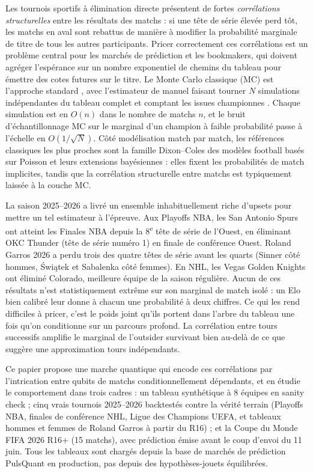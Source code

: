 \documentclass[11pt]{article}
\begin{document}
Les tournois sportifs à élimination directe présentent de fortes
\emph{corrélations structurelles} entre les résultats des matchs : si
une tête de série élevée perd tôt, les matchs en aval sont rebattus de
manière à modifier la probabilité marginale de titre de tous les
autres participants. Pricer correctement ces corrélations est un
problème central pour les marchés de prédiction et les bookmakers, qui
doivent agréger l'espérance sur un nombre exponentiel de chemins du
tableau pour émettre des cotes futures sur le titre. Le Monte Carlo
classique (MC) est l'approche standard
\cite{glasserman2004monte}, avec l'estimateur de manuel faisant tourner
$N$ simulations indépendantes du tableau complet et comptant les
issues championnes \cite{simulate_bracket_pulsquant}. Chaque simulation
est en $O(n)$ dans le nombre de matchs $n$, et le bruit
d'échantillonnage MC sur le marginal d'un champion à faible
probabilité passe à l'échelle en $O(1/\sqrt{N})$. Côté modélisation
match par match, les références classiques les plus proches sont la
famille Dixon--Coles des modèles football basés sur Poisson
\cite{dixon1997modelling} et leurs extensions bayésiennes
\cite{constantinou2017bayesian} : elles fixent les probabilités de
match implicites, tandis que la corrélation structurelle entre matchs
est typiquement laissée à la couche MC.

La saison 2025--2026 a livré un ensemble inhabituellement riche
d'upsets pour mettre un tel estimateur à l'épreuve. Aux Playoffs NBA,
les San Antonio Spurs ont atteint les Finales NBA depuis la
8\textsuperscript{e} tête de série de l'Ouest, en éliminant OKC Thunder
(tête de série numéro 1) en finale de conférence Ouest. Roland Garros
2026 a perdu trois des quatre têtes de série avant les quarts (Sinner
côté hommes, Świątek et Sabalenka côté femmes). En NHL, les Vegas
Golden Knights ont éliminé Colorado, meilleure équipe de la saison
régulière. Aucun de ces résultats n'est statistiquement extrême sur
son marginal de match isolé : un Elo bien calibré leur donne à chacun
une probabilité à deux chiffres. Ce qui les rend difficiles à pricer,
c'est le poids joint qu'ils portent dans l'arbre du tableau une fois
qu'on conditionne sur un parcours profond. La corrélation entre tours
successifs amplifie le marginal de l'outsider survivant bien au-delà
de ce que suggère une approximation tours indépendants.

Ce papier propose une marche quantique qui encode ces corrélations par
l'intrication entre qubits de matchs conditionnellement dépendants, et
en étudie le comportement dans trois cadres : un tableau synthétique à
8 équipes en sanity check ; cinq vrais tournois 2025--2026 backtestés
contre la vérité terrain (Playoffs NBA, finales de conférence NHL,
Ligue des Champions UEFA, et tableaux hommes et femmes de Roland
Garros à partir du R16) ; et la Coupe du Monde FIFA 2026 R16+
(15 matchs), avec prédiction émise avant le coup d'envoi du 11 juin.
Tous les tableaux sont chargés depuis la base de marchés de prédiction
PulsQuant en production, pas depuis des hypothèses-jouets équilibrées.
\end{document}
